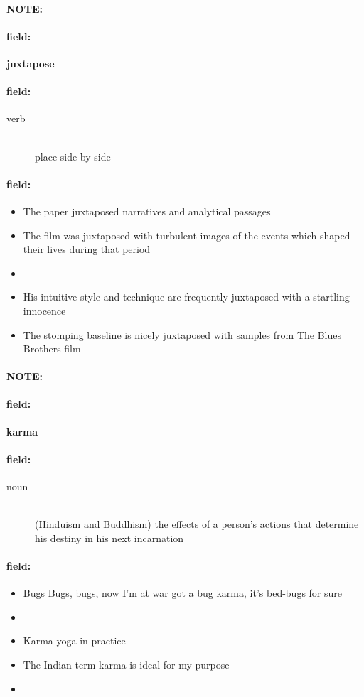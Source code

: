 \documentclass[12pt]{article}
\newenvironment{note}{\paragraph{NOTE:}}{}
\newenvironment{field}{\paragraph{field:}}{}
\begin{document}
\begin{note}
\begin{field}
\textbf{\large juxtapose}
\end{field}


\begin{field}
\begin{description}
\item[verb] \hfill \\ 
place side by side

\end{description}
\end{field}

\begin{field}
\begin{itemize}
\item The paper juxtaposed narratives and analytical passages
\item The film was juxtaposed with turbulent images of the events which shaped their lives during that period
\item 
\item His intuitive style and technique are frequently juxtaposed with a startling innocence
\item The stomping baseline is nicely juxtaposed with samples from The Blues Brothers film
\end{itemize}
\end{field}
\end{note}
\begin{note}
\begin{field}
\textbf{\large karma}
\end{field}


\begin{field}
\begin{description}
\item[noun] \hfill \\ 
(Hinduism and Buddhism) the effects of a person's actions that determine his destiny in his next incarnation

\end{description}
\end{field}

\begin{field}
\begin{itemize}
\item Bugs Bugs, bugs, now I'm at war got a bug karma, it's bed-bugs for sure
\item 
\item Karma yoga in practice
\item The Indian term karma is ideal for my purpose
\item 
\end{itemize}
\end{field}
\end{note}
\end{document}
